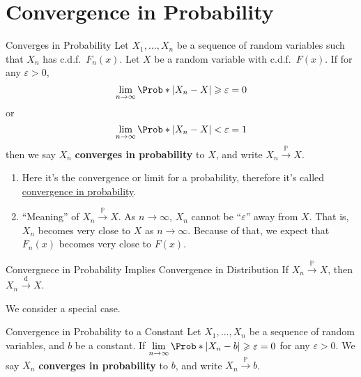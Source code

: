 \section{Convergence in Probability}
\begin{Definition}{Converges in Probability}{}
    Let $ X_1,\ldots,X_n $ be a sequence of random
    variables such that $ X_n $ has
    c.d.f.\ $ F_n(x) $. Let $ X $ be a random variable
    with c.d.f.\ $ F(x) $. If for any $ \varepsilon>0 $,
    \[ \lim\limits_{{n} \to {\infty}}
        \Prob*{\abs*{X_n-X}\geqslant \varepsilon}=0 \]
    or
    \[ \lim\limits_{{n} \to {\infty}}
        \Prob*{\abs*{X_n-X}<\varepsilon}=1 \]
    then we say $ X_n $ \textbf{converges in probability}
    to $ X $, and write $ X_n\stackrel{\mathbb{P}}{\to}X $.
\end{Definition}
\begin{Remark}{}{}
    \begin{enumerate}[label=(\roman*)]
        \item Here it's the convergence or limit for
              a probability, therefore it's called
              \underline{convergence in probability}.
        \item ``Meaning'' of $ X_n\stackrel{\mathbb{P}}{\to}X $.
              As $ n\to\infty $, $ X_n $ cannot be ``$ \varepsilon $''
              away from $ X $. That is, $ X_n $ becomes very
              close to $ X $ as $ n\to\infty $. Because of that,
              we expect that $ F_n(x) $ becomes very close to $ F(x) $.
    \end{enumerate}
\end{Remark}
\begin{Theorem}{Convergnece in Probability Implies Convergence in Distribution}{}
    If $ X_n\stackrel{\mathbb{P}}{\to}X $, then $ X_n\stackrel{\text{d}}{\to} X $.
\end{Theorem}
We consider a special case.
\begin{Definition}{Convergence in Probability to a Constant}{}
    Let $ X_1,\ldots,X_n $ be a sequence of random variables,
    and $ b $ be a constant. If $ \lim\limits_{{n} \to {\infty}}
        \Prob*{\abs*{X_n-b}\geqslant \varepsilon}=0 $
    for any $ \varepsilon>0 $. We say $ X_n $ \textbf{converges
        in probability} to $ b $, and write $ X_n\stackrel{\mathbb{P}}{\to}b $.
\end{Definition}
